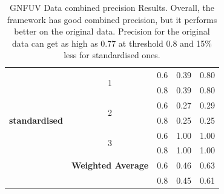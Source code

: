 \documentclass{mpaper}
\begin{document}
\begin{table}[]
\begin{tabular}{|c|cccc|}
                            & \multicolumn{1}{c|}{\multirow{2}{*}{1}}        & \multicolumn{1}{c|}{0.6}                & 0.39             & 0.80              \\
                            & \multicolumn{1}{c|}{}                          & \multicolumn{1}{c|}{0.8}                & 0.39             & 0.80              \\ \cline{2-5} 
                            & \multicolumn{1}{c|}{\multirow{2}{*}{2}}        & \multicolumn{1}{c|}{0.6}                & 0.27             & 0.29              \\
\textbf{standardised}       & \multicolumn{1}{c|}{}                          & \multicolumn{1}{c|}{0.8}                & 0.25             & 0.25              \\ \cline{2-5} 
                            & \multicolumn{1}{c|}{\multirow{2}{*}{3}}        & \multicolumn{1}{c|}{0.6}                & 1.00             & 1.00              \\
                            & \multicolumn{1}{c|}{}                          & \multicolumn{1}{c|}{0.8}                & 1.00             & 1.00              \\ \cline{2-5} 
                            & \multicolumn{1}{c|}{\textbf{Weighted Average}} & \multicolumn{1}{c|}{0.6}                & 0.46             & 0.63              \\
                            & \multicolumn{1}{c|}{}                          & \multicolumn{1}{c|}{0.8}                & 0.45             & 0.61              \\ \hline
\end{tabular}
\caption{\label{tab:gnfuv_combined_preicision_results} GNFUV Data combined precision Results. Overall, the framework has good combined precision, but it performs better on the original data. Precision for the original data can get as high as 0.77 at threshold 0.8 and 15\% less for standardised ones.}
\end{table}
\end{document}
